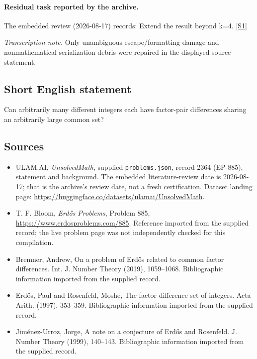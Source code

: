 \documentclass[11pt,a4paper]{article}
\newcommand{\sref}[2]{\hyperlink{source:#1:#2}{[S#2]}}
\begin{document}
\paragraph{Residual task reported by the archive.}

The embedded review (2026-08-17) records: Extend the result beyond k=4. \sref{2364}{1}

{\small\emph{Transcription note.} Only unambiguous escape/formatting damage and nonmathematical serialization debris were repaired in the displayed source statement.}

\subsection{Short English statement}

Can arbitrarily many different integers each have factor-pair differences sharing an arbitrarily large common set?

\subsection{Sources}

{\small

\begin{itemize}

\item[\hypertarget{source:2364:1}{S1}] ULAM.AI, \emph{UnsolvedMath}, supplied \texttt{problems.json}, record 2364 (EP-885), statement and background. The embedded literature-review date is 2026-08-17; that is the archive’s review date, not a fresh certification. Dataset landing page: \url{https://huggingface.co/datasets/ulamai/UnsolvedMath}.

\item[\hypertarget{source:2364:2}{S2}] T. F. Bloom, \emph{Erdős Problems}, Problem 885, \url{https://www.erdosproblems.com/885}. Reference imported from the supplied record; the live problem page was not independently checked for this compilation.

\item[\hypertarget{source:2364:3}{S3}] Bremner, Andrew, On a problem of Erd\H{o}s related to common factor differences. Int. J. Number Theory (2019), 1059--1068. Bibliographic information imported from the supplied record.

\item[\hypertarget{source:2364:4}{S4}] Erd\H{o}s, Paul and Rosenfeld, Moshe, The factor-difference set of integers. Acta Arith. (1997), 353--359. Bibliographic information imported from the supplied record.

\item[\hypertarget{source:2364:5}{S5}] Jim\'{e}nez-Urroz, Jorge, A note on a conjecture of Erd\H{o}s and {R}osenfeld. J. Number Theory (1999), 140--143. Bibliographic information imported from the supplied record.

\end{itemize}

}

\label{end:2364}
\end{document}
